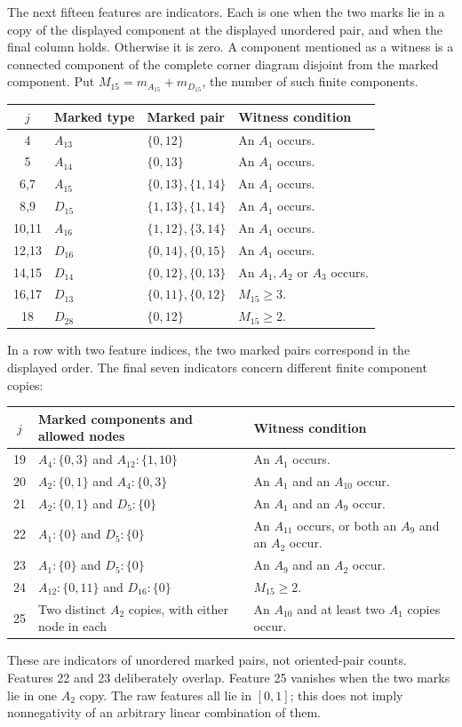 The next fifteen features are indicators. Each is one when the two
marks lie in a copy of the displayed component at the displayed
unordered pair, and when the final column holds. Otherwise it is zero.
A component mentioned as a witness is a connected component of the
complete corner diagram disjoint from the marked component. Put
$M_{15}=m_{A_{15}}+m_{D_{15}}$, the number of such finite components.
\begin{center}\small
\begin{tabular}{cllp{}}
\toprule
$j$&Marked type&Marked pair&Witness condition\\\midrule
4&$A_{13}$&$\{0,12\}$&An $A_1$ occurs.\\
5&$A_{14}$&$\{0,13\}$&An $A_1$ occurs.\\
6,7&$A_{15}$&$\{0,13\},\{1,14\}$&An $A_1$ occurs.\\
8,9&$D_{15}$&$\{1,13\},\{1,14\}$&An $A_1$ occurs.\\
10,11&$A_{16}$&$\{1,12\},\{3,14\}$&An $A_1$ occurs.\\
12,13&$D_{16}$&$\{0,14\},\{0,15\}$&An $A_1$ occurs.\\
14,15&$D_{14}$&$\{0,12\},\{0,13\}$&An $A_1,A_2$ or $A_3$ occurs.\\
16,17&$D_{13}$&$\{0,11\},\{0,12\}$&$M_{15}\ge3$.\\
18&$D_{28}$&$\{0,12\}$&$M_{15}\ge2$.\\
\bottomrule
\end{tabular}
\end{center}
In a row with two feature indices, the two marked pairs correspond
in the displayed order.
The final seven indicators concern different finite component copies:
\begin{center}\small
\begin{tabular}{cp{}p{}}
\toprule
$j$&Marked components and allowed nodes&Witness condition\\\midrule
19&$A_4:\{0,3\}$ and $A_{12}:\{1,10\}$&An $A_1$ occurs.\\
20&$A_2:\{0,1\}$ and $A_4:\{0,3\}$&An $A_1$ and an $A_{10}$ occur.\\
21&$A_2:\{0,1\}$ and $D_5:\{0\}$&An $A_1$ and an $A_9$ occur.\\
22&$A_1:\{0\}$ and $D_5:\{0\}$&An $A_{11}$ occurs, or both an $A_9$ and an $A_2$ occur.\\
23&$A_1:\{0\}$ and $D_5:\{0\}$&An $A_9$ and an $A_2$ occur.\\
24&$A_{12}:\{0,11\}$ and $D_{16}:\{0\}$&$M_{15}\ge2$.\\
25&Two distinct $A_2$ copies, with either node in each&An $A_{10}$ and at least two $A_1$ copies occur.\\
\bottomrule
\end{tabular}
\end{center}
These are indicators of unordered marked pairs, not oriented-pair
counts. Features 22 and 23 deliberately overlap. Feature 25 vanishes
when the two marks lie in one $A_2$ copy. The raw features all lie in
$[0,1]$; this does not imply nonnegativity of an arbitrary linear
combination of them.

